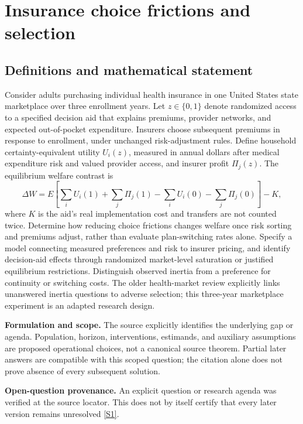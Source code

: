 \documentclass[11pt]{article}
\newcommand{\sref}[2]{\hyperlink{source:#1:#2}{[S#2]}}
\begin{document}
\section*{Insurance choice frictions and selection}\label{30007724}
\subsection{Definitions and mathematical statement}
Consider adults purchasing individual health insurance in one United States state marketplace over three enrollment years. Let \(z\in\{0,1\}\) denote randomized access to a specified decision aid that explains premiums, provider networks, and expected out-of-pocket expenditure. Insurers choose subsequent premiums in response to enrollment, under unchanged risk-adjustment rules. Define household certainty-equivalent utility \(U_i(z)\), measured in annual dollars after medical expenditure risk and valued provider access, and insurer profit \(\Pi_j(z)\). The equilibrium welfare contrast is
\[\Delta W=E\!\left[\sum_i U_i(1)+\sum_j\Pi_j(1)-\sum_iU_i(0)-\sum_j\Pi_j(0)\right]-K,\]
where \(K\) is the aid’s real implementation cost and transfers are not counted twice. Determine how reducing choice frictions changes welfare once risk sorting and premiums adjust, rather than evaluate plan-switching rates alone. Specify a model connecting measured preferences and risk to insurer pricing, and identify decision-aid effects through randomized market-level saturation or justified equilibrium restrictions. Distinguish observed inertia from a preference for continuity or switching costs. The older health-market review explicitly links unanswered inertia questions to adverse selection; this three-year marketplace experiment is an adapted research design.

\par\textbf{Formulation and scope.} The source explicitly identifies the underlying gap or agenda. Population, horizon, interventions, estimands, and auxiliary assumptions are proposed operational choices, not a canonical source theorem. Partial later answers are compatible with this scoped question; the citation alone does not prove absence of every subsequent solution.

\par\textbf{Open-question provenance.} An explicit question or research agenda was verified at the source locator. This does not by itself certify that every later version remains unresolved \sref{30007724}{1}.
\end{document}
